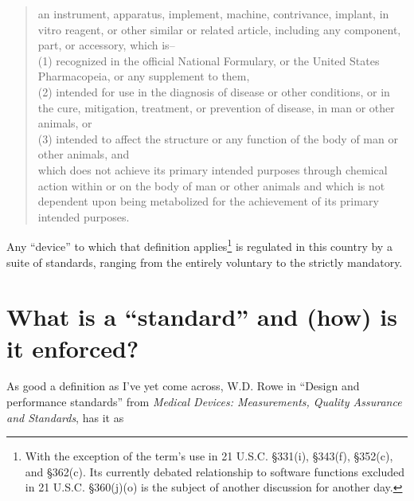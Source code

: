 \documentclass[11pt]{book}
\begin{document}
\begin{quote}
	an instrument, apparatus, implement, machine, contrivance, implant, in vitro reagent, or other similar or related article, including any component, part, or accessory, which is--
	\\
	
(1) recognized in the official National Formulary, or the United States Pharmacopeia, or any supplement to them,\\

(2) intended for use in the diagnosis of disease or other conditions, or in the cure, mitigation, treatment, or prevention of disease, in man or other animals, or\\

(3) intended to affect the structure or any function of the body of man or other animals, and \\

which does not achieve its primary intended purposes through chemical action within or on the body of man or other animals and which is not dependent upon being metabolized for the achievement of its primary intended purposes.
\end{quote}

Any ``device'' to which that definition applies\footnote{With the exception of the term's use in 21 U.S.C. \S331(i), \S343(f), \S352(c), and \S362(c). Its currently debated relationship to software functions excluded in 21 U.S.C. \S 360(j)(o) is the subject of another discussion for another day.} is regulated in this country by a suite of standards, ranging from the entirely voluntary to the strictly mandatory.

\section{What is a ``standard'' and (how) is it enforced?}
As good a definition as I've yet come across, W.D. Rowe in ``Design and performance standards'' from \textit{Medical Devices: Measurements, Quality Assurance and Standards}, has it as
\end{document}
